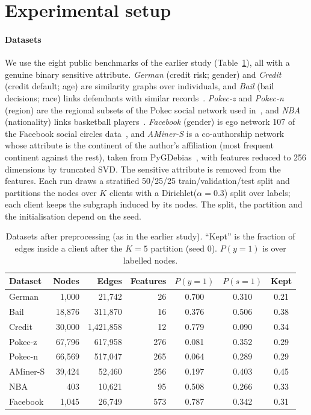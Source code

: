 \section{Experimental setup}\label{sec:setup}

\paragraph{Datasets}
We use the eight public benchmarks of the earlier study (Table~\ref{tab:data}), all with a genuine binary sensitive attribute. \emph{German} (credit risk; gender) and \emph{Credit} (credit default; age) are similarity graphs over individuals, and \emph{Bail} (bail decisions; race) links defendants with similar records~\citep{agarwal2021towards}. \emph{Pokec-z} and \emph{Pokec-n} (region) are the regional subsets of the Pokec social network used in~\citep{dai2021say}, and \emph{NBA} (nationality) links basketball players~\citep{dai2021say}. \emph{Facebook} (gender) is ego network 107 of the Facebook social circles data~\citep{mcauley2012learning}, and \emph{AMiner-S} is a co-authorship network whose attribute is the continent of the author's affiliation (most frequent continent against the rest), taken from PyGDebias~\citep{dong2023fairness}, with features reduced to 256 dimensions by truncated SVD. The sensitive attribute is removed from the features. Each run draws a stratified 50/25/25 train/validation/test split and partitions the nodes over $K$ clients with a Dirichlet($\alpha=0.3$) split over labels; each client keeps the subgraph induced by its nodes. The split, the partition and the initialisation depend on the seed.

\begin{table}[tbp]
\centering
\footnotesize
\setlength{\tabcolsep}{4pt}
\caption{Datasets after preprocessing (as in the earlier study). ``Kept'' is the fraction of edges inside a client after the $K=5$ partition (seed 0). $P(y{=}1)$ is over labelled nodes.}\label{tab:data}
\begin{tabular}{lrrrccc}
\toprule
Dataset & Nodes & Edges & Features & $P(y{=}1)$ & $P(s{=}1)$ & Kept \\
\midrule
German   & 1{,}000  & 21{,}742      & 26  & 0.700 & 0.310 & 0.21 \\
Bail     & 18{,}876 & 311{,}870     & 16  & 0.376 & 0.506 & 0.38 \\
Credit   & 30{,}000 & 1{,}421{,}858 & 12  & 0.779 & 0.090 & 0.34 \\
Pokec-z  & 67{,}796 & 617{,}958     & 276 & 0.081 & 0.352 & 0.29 \\
Pokec-n  & 66{,}569 & 517{,}047     & 265 & 0.064 & 0.289 & 0.29 \\
AMiner-S & 39{,}424 & 52{,}460      & 256 & 0.197 & 0.403 & 0.45 \\
NBA      & 403      & 10{,}621      & 95  & 0.508 & 0.266 & 0.33 \\
Facebook & 1{,}045  & 26{,}749      & 573 & 0.787 & 0.342 & 0.31 \\
\bottomrule
\end{tabular}
\end{table}

